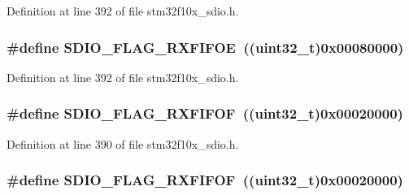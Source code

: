 Definition at line 392 of file stm32f10x\+\_\+sdio.\+h.

\subsubsection[{\texorpdfstring{S\+D\+I\+O\+\_\+\+F\+L\+A\+G\+\_\+\+R\+X\+F\+I\+F\+OE}{SDIO_FLAG_RXFIFOE}}]{\setlength{\rightskip}{0pt plus 5cm}\#define S\+D\+I\+O\+\_\+\+F\+L\+A\+G\+\_\+\+R\+X\+F\+I\+F\+OE~(({\bf uint32\+\_\+t})0x00080000)}\hypertarget{group___s_d_i_o___flags_ga59ea7e2dc22df742053c5e525b98599d}{}\label{group___s_d_i_o___flags_ga59ea7e2dc22df742053c5e525b98599d}


Definition at line 392 of file stm32f10x\+\_\+sdio.\+h.

\subsubsection[{\texorpdfstring{S\+D\+I\+O\+\_\+\+F\+L\+A\+G\+\_\+\+R\+X\+F\+I\+F\+OF}{SDIO_FLAG_RXFIFOF}}]{\setlength{\rightskip}{0pt plus 5cm}\#define S\+D\+I\+O\+\_\+\+F\+L\+A\+G\+\_\+\+R\+X\+F\+I\+F\+OF~(({\bf uint32\+\_\+t})0x00020000)}\hypertarget{group___s_d_i_o___flags_gaf92cb783f000b8d946fe8ace81b51df2}{}\label{group___s_d_i_o___flags_gaf92cb783f000b8d946fe8ace81b51df2}


Definition at line 390 of file stm32f10x\+\_\+sdio.\+h.

\subsubsection[{\texorpdfstring{S\+D\+I\+O\+\_\+\+F\+L\+A\+G\+\_\+\+R\+X\+F\+I\+F\+OF}{SDIO_FLAG_RXFIFOF}}]{\setlength{\rightskip}{0pt plus 5cm}\#define S\+D\+I\+O\+\_\+\+F\+L\+A\+G\+\_\+\+R\+X\+F\+I\+F\+OF~(({\bf uint32\+\_\+t})0x00020000)}\hypertarget{group___s_d_i_o___flags_gaf92cb783f000b8d946fe8ace81b51df2}{}\label{group___s_d_i_o___flags_gaf92cb783f000b8d946fe8ace81b51df2}


